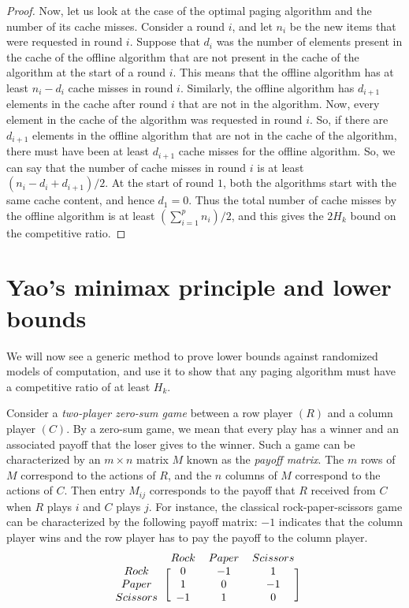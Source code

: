 \begin{proof}
	Now, let us look at the case of the optimal paging algorithm and the number of its cache misses. Consider a round $i$, and let $n_i$ be the new items that were requested in round $i$. Suppose that $d_i$ was the number of elements present in the cache of the offline algorithm that are not present in the cache of the \marker algorithm at the start of a round $i$. This means that the offline algorithm has at least $n_i - d_i$ cache misses in round $i$. Similarly, the offline algorithm has $d_{i+1}$ elements in the cache after round $i$ that are not in the \marker algorithm. Now, every element in the cache of the \marker algorithm was requested in round $i$. So, if there are $d_{i+1}$ elements in the offline algorithm that are not in the cache of the \marker algorithm, there must have been at least $d_{i+1}$ cache misses for the offline algorithm. So, we can say that the number of cache misses in round $i$ is at least $(n_i - d_i + d_{i+1})/2$. At the start of round $1$, both the algorithms start with the same cache content, and hence $d_1 = 0$. Thus the total number of cache misses by the offline algorithm is at least $(\sum_{i=1}^p n_i)/2$, and this gives the $2H_k$ bound on the competitive ratio.
\end{proof}

\section{Yao's minimax principle and lower bounds}

We will now see a generic method to prove lower bounds against randomized models of computation, and use it to show that any paging algorithm must have a competitive ratio of at least $H_k$. 

Consider a \emph{two-player zero-sum game} between a row player $(R)$ and a column player $(C)$. By a zero-sum game, we mean that every play has a winner and an associated payoff that the loser gives to the winner. Such a game can be characterized by an $m\times n$ matrix $M$ known as the \emph{payoff matrix}. The $m$ rows of $M$ correspond to the actions of $R$, and the $n$ columns of $M$ correspond to the actions of $C$. Then entry $M_{ij}$ corresponds to the payoff that $R$ received from $C$ when $R$ plays $i$ and $C$ plays $j$. For instance, the classical rock-paper-scissors game can be characterized by the following payoff matrix: $-1$ indicates that the column player wins and the row player has to pay the payoff to the column player.
\begin{align*}
\begin{blockarray}{cccc}
	& Rock & Paper & Scissors \\
	\begin{block}{c[ccc]}
		Rock & 0 & -1 & 1 \\
		Paper & 1 & 0 & -1 \\
		Scissors & -1 & 1 & 0 \\
	\end{block}
\end{blockarray}
\end{align*}

